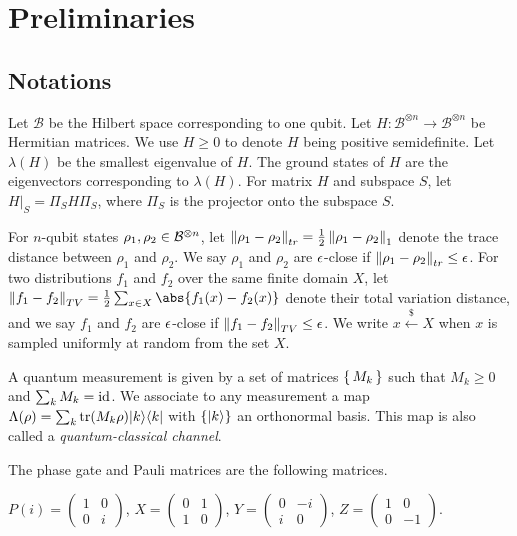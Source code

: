 \section{Preliminaries}

\subsection{Notations}

Let $\mathcal{B}$ be the Hilbert space corresponding to one qubit. Let $H:\mathcal{B}^{\otimes n}\rightarrow\mathcal{B}^{\otimes n}$ be Hermitian matrices. We use $H\geq0$ to denote $H$ being positive semidefinite. Let $\lambda(H)$ be the smallest eigenvalue of $H$. The ground states of $H$ are the eigenvectors corresponding to $\lambda(H)$. For matrix $H$ and subspace $S$, let $H\big|_S=\Pi_S H \Pi_S$, where $\Pi_S$ is the projector onto the subspace $S$. 

For $n$-qubit states $\rho_1, \rho_2\in\mathcal{B}^{\otimes n}$,
let $\left\lVert\rho_1-\rho_2\right\rVert_{tr}=\frac{1}{2}\left\lVert\rho_1-\rho_2\right\rVert_1$ denote the trace distance between $\rho_1$ and $\rho_2$. We say $\rho_1$ and $\rho_2$ are $\epsilon$-close if $\left\lVert\rho_1- \rho_2\right\rVert_{tr}\leq\epsilon$.
For two distributions $f_1$ and $f_2$ over the same finite domain $X$, let $\norm{f_1-f_2}_{TV}=\frac{1}{2}\sum_{x\in X}\abs{f_1(x)-f_2(x)}$ denote their total variation distance,
and we say $f_1$ and $f_2$ are $\epsilon$-close if $\left\lVert f_1-f_2\right\rVert_{TV}\leq\epsilon$.
We write $x\xleftarrow{\$}X$ when $x$ is sampled uniformly at random from the set $X$.

\begin{definition} 
	\label{def:QCChannel}
	A quantum measurement is given by a set of matrices $\set{M_k}$ such that $M_k\geq0$ and $\sum_k M_k=\operatorname{id}$.
	We associate to any measurement a map $\Lambda(\rho)=\sum_k \operatorname{tr}(M_k\rho)|k\rangle\langle k|$
	with $\{\ket{k}\}$ an orthonormal basis.
	This map is also called a \emph{quantum-classical channel}.
\end{definition}

The phase gate and Pauli matrices are the following matrices.

\begin{definition}
	$P(i)=\begin{pmatrix}1&0\\0&i\end{pmatrix}$,
	$X=\begin{pmatrix}0&1\\1&0\end{pmatrix}$,
	$Y=\begin{pmatrix}0&-i\\i&0\end{pmatrix}$,
	$Z=\begin{pmatrix}1&0\\0&-1\end{pmatrix}$.
\end{definition}

